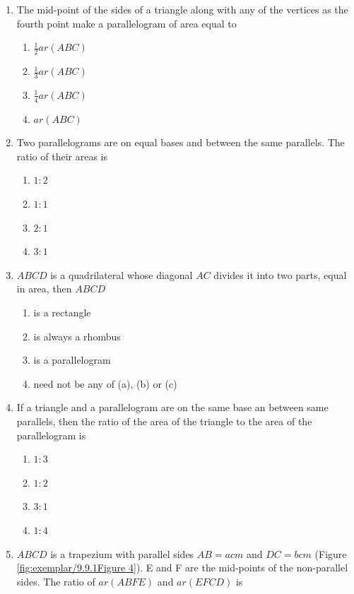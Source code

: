 \documentclass{article}
\begin{document}
\begin{enumerate}[label=\thesection.\arabic*,ref=\thesection.\theenumi]
\begin{figure}[!h]
\begin{center}
\end{center}
\caption{}
\label{fig:exemplar/9.9.1Figure 3}
\end{figure}
\item The mid-point of the sides of a triangle along with any of the vertices as the fourth point make a parallelogram of area equal to
\begin{enumerate}
\item $\frac{1}{2} ar (ABC)$  
\item $\frac{1}{3} ar (ABC)$
\item $\frac{1}{4} ar (ABC)$
\item $ar (ABC)$
\end{enumerate}
\item Two parallelograms are on equal bases and between the same parallels. The ratio of their areas is
	\begin{enumerate}
\item $1:2$  \item $1:1$  \item $2:1$  \item $3:1$
\end{enumerate}
\item $ABCD$ is a quadrilateral whose diagonal $AC$ divides it into two parts, equal in area, then $ABCD$
\begin{enumerate}
\item is a rectangle       \item is always a rhombus
\item is a parallelogram   \item need not be any of (a), (b) or (c)
\end{enumerate}
\item If a triangle and a parallelogram are on the same base an between same parallels, then the ratio of the area of the triangle to the area of the parallelogram is
\begin{enumerate}
\item $1:3$  \item $1:2$  \item $3:1$  \item $1:4$
\end{enumerate}
\item $ABCD$ is a trapezium with parallel sides $AB = a cm$ and $DC = b cm$ (Figure \ref{fig:exemplar/9.9.1Figure 4}). E and F are the mid-points of the non-parallel sides. The ratio of $ar (ABFE)$ and $ar (EFCD)$ is
\begin{figure}[!h]
\begin{center}

\end{center}
\end{figure}
\end{enumerate}
\end{document}
